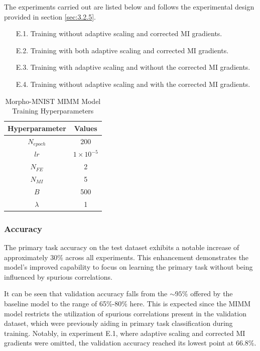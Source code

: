 \documentclass[12pt,DIV14,BCOR12mm,a4paper,footinclude=false,headinclude,parskip=half-,twoside,openright,cleardoublepage=empty,toc=index,bibliography=totoc,listof=totoc]{scrreprt}
\numberwithin{equation}{chapter}
\begin{document}
The experiments carried out are listed below and follows the experimental design provided in section \ref{sec:3.2.5}.

\begin{itemize}
    \item [E.1.] Training without adaptive scaling and corrected MI gradients.
    \item [E.2.] Training with both adaptive scaling and corrected MI gradients.    
    \item [E.3.] Training with adaptive scaling and without the corrected MI gradients.
    \item [E.4.] Training without adaptive scaling and with the corrected MI gradients.
\end{itemize}

\begin{table}[H]
\centering
\begin{tabular}{|C|C|}
\hline
\textbf{Hyperparameter} & \textbf{Values} \\
\hline
$N_{epoch}$ & 200 \\
$lr$ & $1\times10^{-5}$\\
$N_{FE}$ & 2\\
$N_{MI}$ & 5 \\
$B$ & 500 \\
$\lambda$ & 1  \\
\hline
\end{tabular}
\caption{Morpho-MNIST MIMM Model Training Hyperparameters}
\label{tab:MMNIST_MIMM_HP}
\end{table}

\subsubsection{Accuracy}


The primary task accuracy on the test dataset exhibits a notable increase of approximately $30\%$ across all experiments. This enhancement demonstrates the model's improved capability to focus on learning the primary task without being influenced by spurious correlations.

It can be seen that validation accuracy falls from the $\sim95\%$ offered by the baseline model to the range of 65\%-80\% here. This is expected since the MIMM model restricts the utilization of spurious correlations present in the validation dataset, which were previously aiding in primary task classification during training. Notably, in experiment E.1, where adaptive scaling and corrected MI gradients were omitted, the validation accuracy reached its lowest point at 66.8\%.
\end{document}
